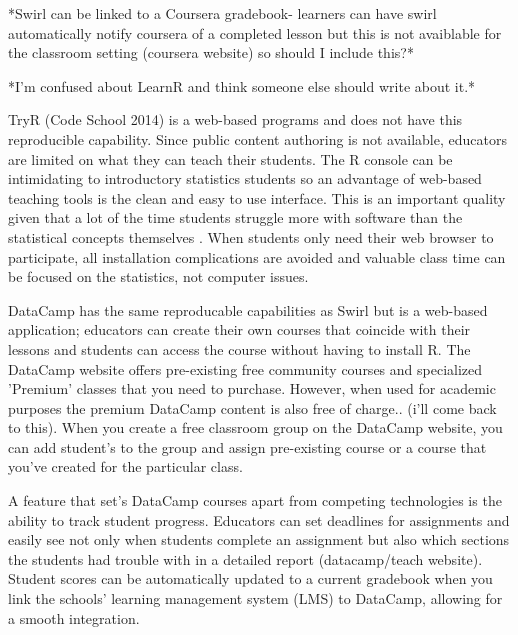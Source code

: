 \documentclass{tise_style}
\begin{document}
*Swirl can be linked to a Coursera gradebook- learners can have swirl automatically notify coursera of a completed lesson
but this is not avaiblable for the classroom setting (coursera website) so should I include this?*

*I'm confused about LearnR and think someone else should write about it.*

TryR (Code School 2014) is a web-based programs and does not have this reproducible capability. Since public content authoring
is not available, educators are limited on what they can teach their students. The R console can be intimidating to
introductory statistics students so an advantage of web-based teaching tools is
the clean and easy to use interface. This is an important quality given that a lot of the time students struggle more with
software than the statistical concepts themselves \citep{Hare2017}. When students only need their web browser to participate,
all installation complications are avoided and valuable class time can be focused on the statistics, not computer issues.


DataCamp has the same reproducable capabilities as Swirl but is a web-based application; educators can
create their own courses that coincide with their lessons and students can access the course without having to install R.
The DataCamp website offers pre-existing free community courses and specialized 'Premium' classes that you need to purchase.
However, when used for academic purposes the premium DataCamp content is also free of charge.. (i'll come back to this).
When you create a free classroom group on the DataCamp website, you can add student's to the group and assign pre-existing
course or a course that you've created for the particular class.

A feature that set's DataCamp courses apart from competing technologies is the ability to track student progress. Educators
can set deadlines for assignments and easily see not only when students complete an assignment but also which sections the
students had trouble with in a detailed report (datacamp/teach website). Student scores can be automatically updated to a
current gradebook when you link the schools' learning management system (LMS) to DataCamp, allowing for a smooth integration.
\end{document}

